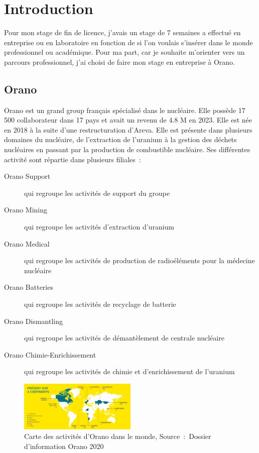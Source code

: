 \section{Introduction}

Pour mon stage de fin de licence, j'avais un stage de 7 semaines a effectué en entreprise ou en laboratoire en fonction de si l'on voulais s'insérer dans le monde professionnel ou académique. Pour ma part, car je souhaite  m'orienter vers un parcours professionnel, j'ai choisi de faire mon stage en entreprise à Orano.
\subsection{Orano}
Orano est un grand group français spécialisé dans le nucléaire. Elle possède 17 500 collaborateur dans 17 pays et avait un revenu de 4.8 M en 2023\cite{report:rapport_activiter}. Elle est née en 2018 à la suite d'une restructuration d'Areva. Elle est présente dans plusieurs domaines du nucléaire, de l'extraction de l'uranium à la gestion des déchets nucléaires en passant par la production de combustible nucléaire. Ses différentes activité sont répartie dans plusieurs filiales~:
\begin{description}
\item [Orano Support] qui regroupe les activités de support du groupe
\item [Orano Mining] qui regroupe les activités d'extraction d'uranium
\item [Orano Medical] qui regroupe les activités de production de radioéléments pour la médecine nucléaire
\item [Orano Batteries] qui regroupe les activités de recyclage de batterie
\item [Orano Dismantling] qui regroupe les activités de démantèlement de centrale nucléaire
\item [Orano Chimie-Enrichissement] qui regroupe les activités de chimie et d'enrichissement de l'uranium
\end{description}
\begin{figure}
    \centering
    \includegraphics[width=0.5\textwidth]{img/Carte-ornao-international.png}
    \caption[Carte des activités d’Orano dans le monde]{Carte des activités d’Orano dans le monde, Source~:~Dossier d’information Orano 2020}
    \label{fig_carte_orano}
\end{figure}









